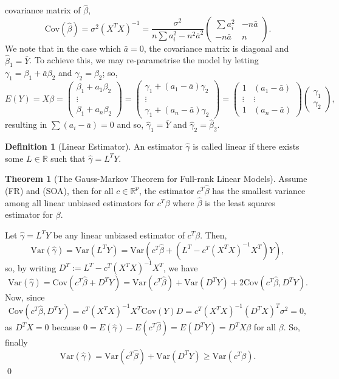 \documentclass[
]{article}
\theoremstyle{definition}
\newtheorem{theorem}{Theorem}
\theoremstyle{definition}
\newtheorem{definition}{Definition}[section]
\begin{document}
covariance matrix of \(\hat \beta\),
\[\text{Cov}(\hat \beta) = \sigma^2 (X^T X)^{-1} = 
  \frac{\sigma^2}{n \sum a_i^2 - n^2 \bar a^2}
\begin{pmatrix}
  \sum a_i^2 & -n \bar a \\ - n \bar a & n
\end{pmatrix}.\] We note that in the case which \(\bar a = 0\), the
covariance matrix is diagonal and \(\hat \beta_1 = \bar Y\). To achieve
this, we may re-parametrise the model by letting
\(\gamma_1 = \beta_1 + \bar a \beta_2\) and \(\gamma_2 = \beta_2\); so,
\[E(Y) = X \beta = 
\begin{pmatrix}
  \beta_1 + a_1 \beta_2 \\ \vdots \\ \beta_1 + a_n \beta_2
\end{pmatrix}
=
\begin{pmatrix}
  \gamma_1 + (a_1 - \bar a) \gamma_2\\ \vdots \\
  \gamma_1 + (a_n - \bar a) \gamma_2
\end{pmatrix} 
= 
\begin{pmatrix}
  1 & (a_1 - \bar a)\\ \vdots & \vdots \\ 1 & (a_n - \bar a)
\end{pmatrix} 
\begin{pmatrix}
  \gamma_1 \\ \gamma_2
\end{pmatrix},\] resulting in \(\sum (a_i - \bar a) = 0\) and so,
\(\hat \gamma_1 = \bar Y\) and \(\hat \gamma_2 = \hat \beta_2\).

\begin{definition}[Linear Estimator]
  An estimator \(\hat \gamma\) is called linear if there exists some 
  \(L \in \mathbb{R}\) such that \(\hat{\gamma} = L^T Y\).
\end{definition}

\begin{theorem}[The Gauss-Markov Theorem for Full-rank Linear Models]
  Assume (FR) and (SOA), then for all \(c \in \mathbb{R}^p\), the estimator 
  \(c^T \hat \beta\) has the smallest variance among all linear unbiased estimators 
  for \(c^T \beta\) where \(\hat \beta\) is the least squares estimator for \(\beta\).
\end{theorem}
\proof

Let \(\hat \gamma = L^T Y\) be any linear unbiased estimator of
\(c^T \beta\). Then,
\[\text{Var}(\hat \gamma) = \text{Var}(L^T Y) = \text{Var}(c^T \hat \beta 
      + (L^T - c^T(X^T X)^{-1}X^T) Y),\] so, by writing
\(D^T := L^T - c^T(X^T X)^{-1}X^T\), we have
\[\text{Var}(\hat \gamma) = \text{Cov}(c^T \hat \beta + D^T Y)
    = \text{Var}(c^T \hat \beta) 
    + \text{Var}(D^T Y)
    + 2 \text{Cov}(c^T \hat \beta, D^T Y).\] Now, since
\[\text{Cov}(c^T \hat \beta, D^T Y) = c^T(X^T X)^{-1} X^T \text{Cov}(Y)D = 
    c^T(X^T X)^{-1}(D^T X)^T \sigma^2 = 0,\] as \(D^T X = 0\) because
\(0 = E(\hat \gamma) - E(c^T \hat \beta) = E(D^T Y) = D^T X \beta\) for
all \(\beta\). So, finally
\[\text{Var}(\hat \gamma) = \text{Var}(c^T \hat \beta) + 
    \text{Var}(D^T Y) \ge \text{Var}(c^T \beta).\] \qed
\end{document}
